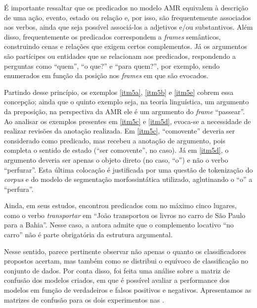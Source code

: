 É importante ressaltar que os predicados no modelo AMR equivalem à
descrição de uma ação, evento, estado ou relação e, por isso, são
frequentemente associados aos verbos, ainda que seja possível
associá-los a adjetivos e/ou substantivos. Além disso, frequentemente os
predicados correspondem a \emph{frames} semânticos, construindo cenas e
relações que exigem certos complementos. Já os argumentos são partícipes
ou entidades que se relacionam aos predicados, respondendo a perguntas
como ``quem'', ``o que?'' e ``para quem?'', por exemplo, sendo
enumerados em função da posição nos \emph{frames} em que são evocados.

Partindo desse princípio, os exemplos \ref{itm5a}, \ref{itm5b} e \ref{itm5e} cobrem essa
concepção; ainda que o quinto exemplo seja, na teoria linguística, um
argumento da preposição, na perspectiva da AMR ele é um argumento do
\emph{frame} ``passear''. Ao analisar os exemplos presentes em \ref{itm5c} e
\ref{itm5d}, evoca-se a necessidade de realizar revisões da anotação realizada.
Em \ref{itm5c}, ``comovente'' deveria ser considerado como predicado, mas
recebeu a anotação de argumento, pois completa o sentido de estado
(``ser comovente'', no caso). Já em \ref{itm5d}, o argumento deveria ser apenas
o objeto direto (no caso, ``o'') e não o verbo ``perfurar''. Esta última
colocação é justificada por uma questão de tokenização do \emph{corpus}
e do modelo de segmentação morfossintática utilizado, aglutinando o
``o'' a ``perfura''.

Ainda, em seus estudos, \textcite{cançado2009} encontrou predicados com no
máximo cinco lugares, como o verbo \emph{transportar} em ``João
transportou os livros no carro de São Paulo para a Bahia''. Nesse caso,
a autora admite que o complemento locativo ``no carro'' não é parte
obrigatória da estrutura argumental.

Nesse sentido, parece pertinente observar não apenas o quanto os
classificadores propostos acertam, mas também como se distribui o
equívoco de classificação no conjunto de dados. Por conta disso, foi
feita uma análise sobre a matriz de confusão dos modelos criados, em que
é possível avaliar a performance dos modelos em função de verdadeiros e
falsos positivos e negativos. Apresentamos as matrizes de confusão para
os dois experimentos nas .


